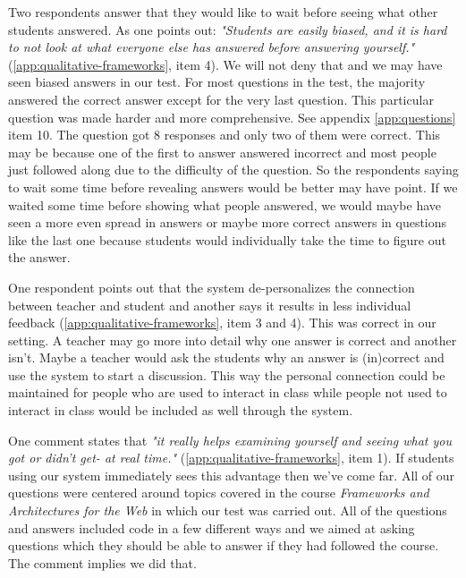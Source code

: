Two respondents answer that they would like to wait before seeing what other students answered. As one points out: \emph{"Students are easily biased, and it is hard to not look at what everyone else has answered before answering yourself."} (\ref{app:qualitative-frameworks}, item 4). We will not deny that and we may have seen biased answers in our test. For most questions in the test, the majority answered the correct answer except for the very last question. This particular question was made harder and more comprehensive. See appendix \ref{app:questions} item 10. The question got 8 responses and only two of them were correct. This may be because one of the first to answer answered incorrect and most people just followed along due to the difficulty of the question. So the respondents saying to wait some time before revealing answers would be better may have point. If we waited some time before showing what people answered, we would maybe have seen a more even spread in answers or maybe more correct answers in questions like the last one because students would individually take the time to figure out the answer. 

One respondent points out that the system de-personalizes the connection between teacher and student and another says it results in less individual feedback (\ref{app:qualitative-frameworks}, item 3 and 4). This was correct in our setting. A teacher may go more into detail why one answer is correct and another isn't. Maybe a teacher would ask the students why an answer is (in)correct and use the system to start a discussion. This way the personal connection could be maintained for people who are used to interact in class while people not used to interact in class would be included as well through the system.

One comment states that \emph{"it really helps examining yourself and seeing what you got or didn't get- at real time."} (\ref{app:qualitative-frameworks}, item 1). If students using our system immediately sees this advantage then we've come far. All of our questions were centered around topics covered in the course \emph{Frameworks and Architectures for the Web} in which our test was carried out. All of the questions and answers included code in a few different ways and we aimed at asking questions which they should be able to answer if they had followed the course. The comment implies we did that. 


